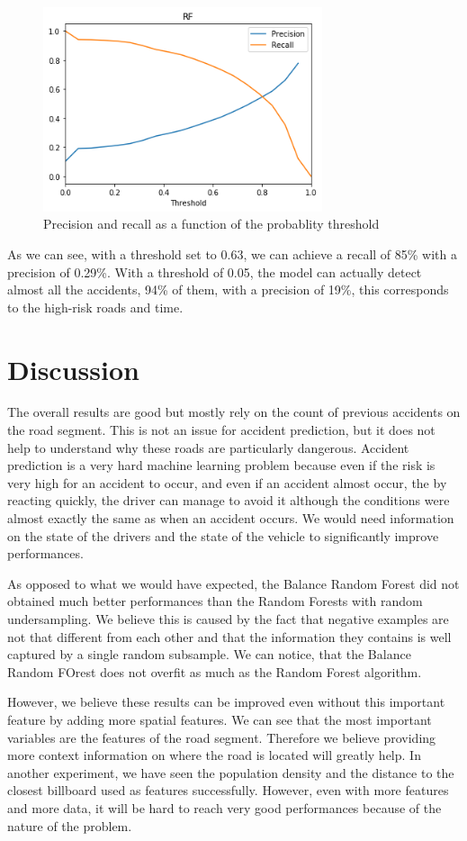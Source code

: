 \documentclass[conference]{IEEEtran}
\begin{document}
\begin{figure}[htbp]
\centerline{\includegraphics[height=6cm, keepaspectratio]{figures/pr.png}}
\caption{Precision and recall as a function of the probablity threshold}
\label{fig}
\end{figure}

As we can see, with a threshold set to 0.63, we can achieve a recall of 85\% with a precision of 0.29\%. With a threshold of 0.05, the model can actually detect almost all the accidents, 94\% of them, with a precision of 19\%, this corresponds to the high-risk roads and time.

\section{Discussion}
The overall results are good but mostly rely on the count of previous accidents on the road segment. This is not an issue for accident prediction, but it does not help to understand why these roads are particularly dangerous. Accident prediction is a very hard machine learning problem because even if the risk is very high for an accident to occur, and even if an accident almost occur, the by reacting quickly, the driver can manage to avoid it although the conditions were almost exactly the same as when an accident occurs. We would need information on the state of the drivers and the state of the vehicle to significantly improve performances.

As opposed to what we would have expected, the Balance Random Forest did not obtained much better performances than the Random Forests with random undersampling. We believe this is caused by the fact that negative examples are not that different from each other and that the information they contains is well captured by a single random subsample. We can notice, that the Balance Random FOrest does not overfit as much as the Random Forest algorithm.

However, we believe these results can be improved even without this important feature by adding more spatial features. We can see that the most important variables are the features of the road segment. Therefore we believe providing more context information on where the road is located will greatly help. In another experiment, we have seen the population density and the distance to the closest billboard used as features successfully. However, even with more features and more data, it will be hard to reach very good performances because of the nature of the problem.
\end{document}
